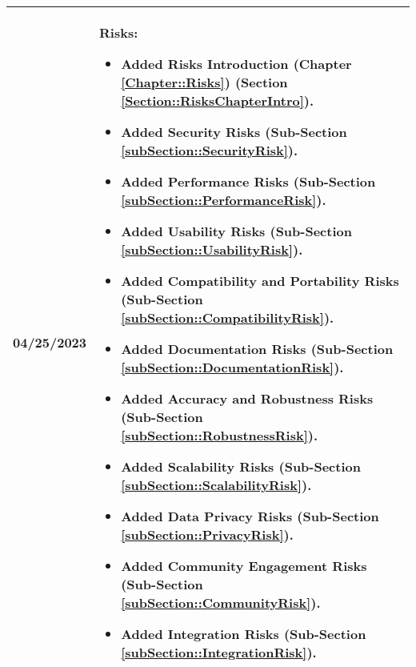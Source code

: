 \begin{longtable}{|l||p{13.5cm}|}
04/25/2023 & Risks:
\begin{itemize}[topsep=0pt,itemsep=0pt,parsep=0pt,partopsep=0pt,leftmargin=12pt]
\item Added Risks Introduction (Chapter \ref{Chapter::Risks}) (Section \ref{Section::RisksChapterIntro}). 
\item Added Security Risks (Sub-Section \ref{subSection::SecurityRisk}).
\item Added Performance Risks (Sub-Section \ref{subSection::PerformanceRisk}).
\item Added Usability Risks (Sub-Section \ref{subSection::UsabilityRisk}).
\item Added Compatibility and Portability Risks (Sub-Section \ref{subSection::CompatibilityRisk}).
\item Added Documentation Risks (Sub-Section \ref{subSection::DocumentationRisk}).
\item Added Accuracy and Robustness Risks (Sub-Section \ref{subSection::RobustnessRisk}).
\item Added Scalability Risks (Sub-Section \ref{subSection::ScalabilityRisk}).
\item Added Data Privacy Risks (Sub-Section \ref{subSection::PrivacyRisk}).
\item Added Community Engagement Risks (Sub-Section \ref{subSection::CommunityRisk}).
\item Added Integration Risks (Sub-Section \ref{subSection::IntegrationRisk}).
\end{itemize} 
\\ \hline


\end{longtable}
